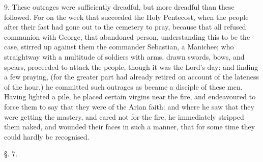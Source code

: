 9. These outrages were sufficiently dreadful, but
more dreadful than these followed. For on the week that succeeded the
Holy Pentecost, when the people after their fast had gone out to the
cemetery to pray, because that all refused communion with George, that
abandoned person, understanding this to be the case, stirred up
against them the commander Sebastian, a Manichee; who straightway with
a multitude of soldiers with arms, drawn swords, bows, and spears,
proceeded to attack the people, though it was the Lord's day: and
finding a few praying, (for the greater part had already retired on
account of the lateness of the hour,) he committed such outrages as
became a disciple of these men. Having lighted a pile, he placed
certain virgins near the fire, and endeavoured to force them to say
that they were of the Arian faith: and where he saw that they were
getting the mastery, and cared not for the fire, he immediately
stripped them naked, and wounded their faces in such a manner, that
for some time they could hardly be recognised.

§. 7.

